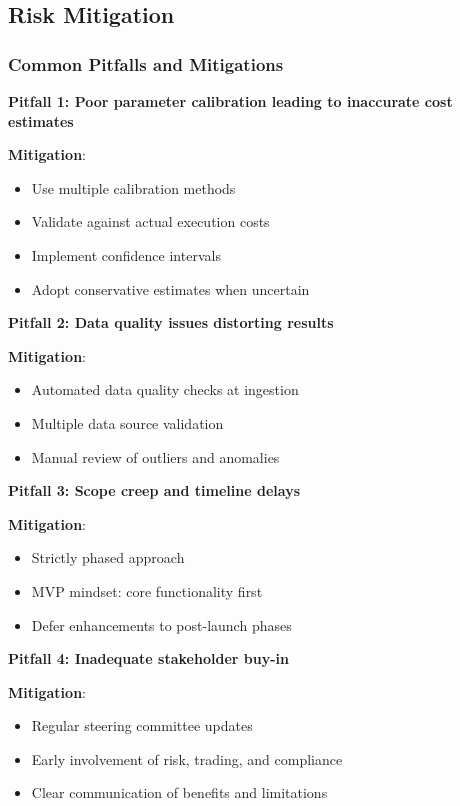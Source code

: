 \documentclass[11pt,a4paper]{article}
\begin{document}
\subsection{Risk Mitigation}

\subsubsection{Common Pitfalls and Mitigations}

\textbf{Pitfall 1: Poor parameter calibration leading to inaccurate cost estimates}

\textbf{Mitigation}:
\begin{itemize}
    \item Use multiple calibration methods
    \item Validate against actual execution costs
    \item Implement confidence intervals
    \item Adopt conservative estimates when uncertain
\end{itemize}

\textbf{Pitfall 2: Data quality issues distorting results}

\textbf{Mitigation}:
\begin{itemize}
    \item Automated data quality checks at ingestion
    \item Multiple data source validation
    \item Manual review of outliers and anomalies
\end{itemize}

\textbf{Pitfall 3: Scope creep and timeline delays}

\textbf{Mitigation}:
\begin{itemize}
    \item Strictly phased approach
    \item MVP mindset: core functionality first
    \item Defer enhancements to post-launch phases
\end{itemize}

\textbf{Pitfall 4: Inadequate stakeholder buy-in}

\textbf{Mitigation}:
\begin{itemize}
    \item Regular steering committee updates
    \item Early involvement of risk, trading, and compliance
    \item Clear communication of benefits and limitations
\end{itemize}
\end{document}

